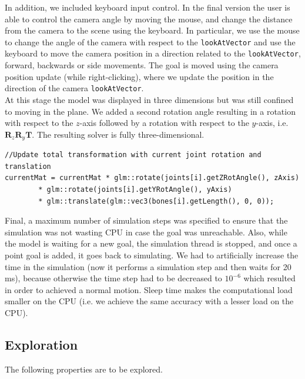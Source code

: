 \documentclass[paper=a4, fontsize=11pt]{scrartcl} %
\numberwithin{equation}{section} %
\numberwithin{figure}{section} %
\numberwithin{table}{section} %
\begin{document}
In addition, we included keyboard input control. In the final version the user is able to control the camera angle by moving the mouse, and change the distance from the camera to the scene using the keyboard. In particular, we use the mouse to change the angle of the camera with respect to the \texttt{lookAtVector} and use the keyboard to move the camera position in a direction related to the \texttt{lookAtVector}, forward, backwards or side movements. The goal is moved using the camera position update (while right-clicking), where we update the position in the direction of the camera \texttt{lookAtVector}.\\

At this stage the model was displayed in three dimensions but was still confined to moving in the plane. We added a second rotation angle resulting in a rotation with respect to the \(z\)-axis followed by a rotation with respect to the \(y\)-axis, i.e. \( \mathbf{R}_z \mathbf{R}_y \mathbf{T}\). The resulting solver is fully three-dimensional. \\

\begin{mdframed}
\begin{scriptsize}
\begin{lstlisting}
//Update total transformation with current joint rotation and translation
currentMat = currentMat * glm::rotate(joints[i].getZRotAngle(), zAxis)
		* glm::rotate(joints[i].getYRotAngle(), yAxis)
		* glm::translate(glm::vec3(bones[i].getLength(), 0, 0));
\end{lstlisting}
\end{scriptsize}
\end{mdframed}

Final, a maximum number of simulation steps was specified to ensure that the simulation was not wasting CPU in case the goal was unreachable. Also, while the model is waiting for a new goal, the simulation thread is stopped, and once a point goal is added, it goes back to simulating. We had to artificially increase the time in the simulation (now it performs a simulation step and then waits for 20 ms), because otherwise the time step had to be decreased to \(10^{-6}\) which resulted in order to achieved a normal motion. Sleep time makes the computational load smaller on the CPU (i.e. we achieve the same accuracy with a lesser load on the CPU). 
  
\subsection{Exploration}
The following properties are to be explored.\\
\end{document}
